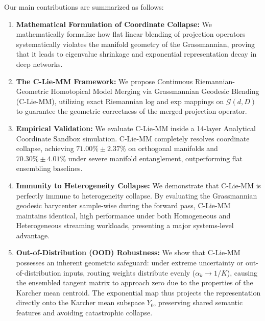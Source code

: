 Our main contributions are summarized as follows:
\begin{enumerate}
    \item \textbf{Mathematical Formulation of Coordinate Collapse:} We mathematically formalize how flat linear blending of projection operators systematically violates the manifold geometry of the Grassmannian, proving that it leads to eigenvalue shrinkage and exponential representation decay in deep networks.
    \item \textbf{The C-Lie-MM Framework:} We propose Continuous Riemannian-Geometric Homotopical Model Merging via Grassmannian Geodesic Blending (C-Lie-MM), utilizing exact Riemannian log and exp mappings on $\mathcal{G}(d, D)$ to guarantee the geometric correctness of the merged projection operator.
    \item \textbf{Empirical Validation:} We evaluate C-Lie-MM inside a 14-layer Analytical Coordinate Sandbox simulation. C-Lie-MM completely resolves coordinate collapse, achieving $71.00\% \pm 2.37\%$ on orthogonal manifolds and $70.30\% \pm 4.01\%$ under severe manifold entanglement, outperforming flat ensembling baselines.
    \item \textbf{Immunity to Heterogeneity Collapse:} We demonstrate that C-Lie-MM is perfectly immune to heterogeneity collapse. By evaluating the Grassmannian geodesic barycenter sample-wise during the forward pass, C-Lie-MM maintains identical, high performance under both Homogeneous and Heterogeneous streaming workloads, presenting a major systems-level advantage.
    \item \textbf{Out-of-Distribution (OOD) Robustness:} We show that C-Lie-MM possesses an inherent geometric safeguard: under extreme uncertainty or out-of-distribution inputs, routing weights distribute evenly ($\alpha_k \to 1/K$), causing the ensembled tangent matrix to approach zero due to the properties of the Karcher mean centroid. The exponential map thus projects the representation directly onto the Karcher mean subspace $Y_0$, preserving shared semantic features and avoiding catastrophic collapse.
\end{enumerate}
